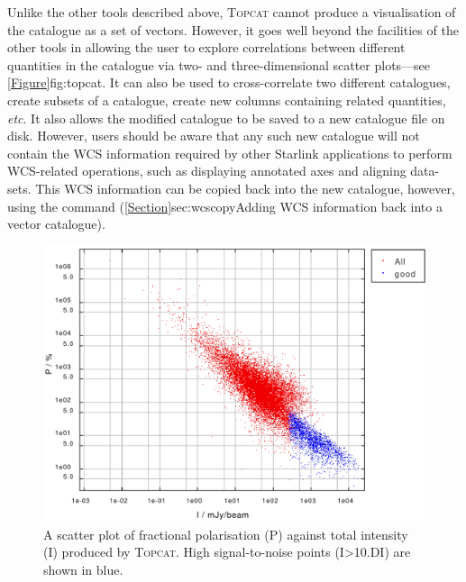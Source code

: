 \begin{terminalv}
\end{terminalv}

Unlike the other tools described above, \textsc{Topcat} cannot produce a
visualisation of the catalogue as a set of vectors. However, it goes well beyond
the facilities of the other tools in allowing the user to explore correlations
between different quantities in the catalogue via two- and three-dimensional
scatter plots---see \cref{Figure}{fig:topcat}{}. It can also be used to cross-correlate
two different catalogues, create subsets of a catalogue, create new columns
containing related quantities, \emph{etc}. It also allows the modified
catalogue to be saved to a new catalogue file on disk. However, users should be
aware that any such new catalogue will not contain the WCS information required
by other Starlink applications to perform WCS-related operations, such as
displaying annotated axes and aligning data-sets. This WCS
information can be copied back into the new catalogue, however, using the
 command
(\cref{Section}{sec:wcscopy}{Adding WCS information back into a vector
catalogue}).

\begin{figure}[t!]
\begin{center}
\includegraphics[width=0.85\linewidth]{sc22-topcat}
\caption [A TOPCAT scatter plot]{A scatter plot of fractional polarisation (P)
against total intensity (I) produced by \textsc{Topcat}. High signal-to-noise points
(I>10.DI) are shown in blue.\label{fig:topcat}}
\end{center}
\end{figure}

